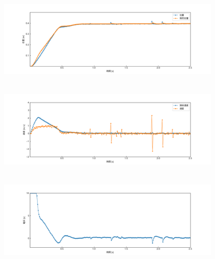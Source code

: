 \documentclass[12pt]{jsarticle}
\begin{document}
\begin{figure}[H]
  \begin{center}
    \includegraphics[clip,width=13.0cm, height=4.4cm]{../img/Exp14-1.png}
    \caption{}
    \label{Exp14-1}
  \end{center}
\end{figure}
\begin{figure}[H]
  \begin{center}
    \includegraphics[clip,width=13.0cm, height=4.4cm]{../img/Exp14-2.png}
    \caption{}
    \label{Exp14-2}
  \end{center}
\end{figure}
\begin{figure}[H]
  \begin{center}
    \includegraphics[clip,width=13.0cm, height=4.4cm]{../img/Exp14-3.png}
    \caption{}
    \label{Exp14-3}
  \end{center}
\end{figure}
\end{document}
